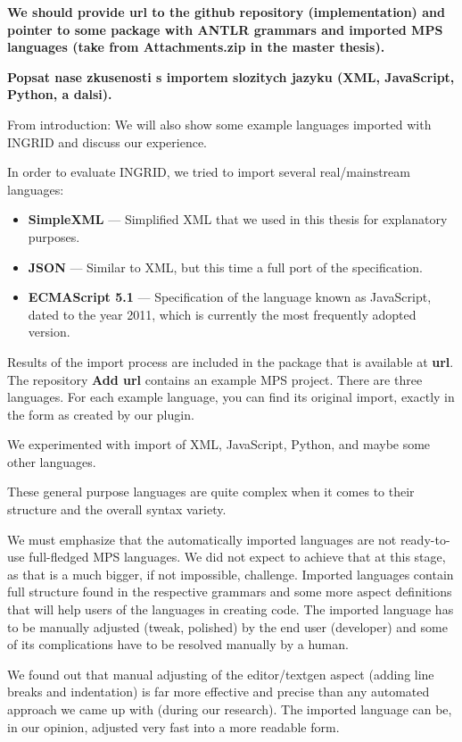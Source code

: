 \documentclass[10pt]{sigplanconf}
\newcommand{\todo}[1]{{\bfseries #1}}
\begin{document}
\todo{
	We should provide url to the github repository (implementation) and pointer to some package with ANTLR grammars and imported MPS languages (take from Attachments.zip in the master thesis).
}

\todo{Popsat nase zkusenosti s importem slozitych jazyku (XML, JavaScript, Python, a dalsi).}

From introduction: We will also show some example languages imported with INGRID and discuss our experience.

In order to evaluate INGRID, we tried to import several real/mainstream languages:
\begin{itemize}
	\item \textbf{SimpleXML} --- Simplified XML that we used in this thesis for explanatory purposes.
	\item \textbf{JSON} --- Similar to XML, but this time a full port of the specification.
	\item \textbf{ECMAScript 5.1} --- Specification of the language known as JavaScript, dated to the year 2011, which is currently the most frequently adopted version.
\end{itemize}
Results of the import process are included in the package that is available at \todo{url}.
The repository \todo{Add url} contains an example MPS project. There are three languages.
For each example language, you can find its original import, exactly in the form as created by our plugin.

We experimented with import of XML, JavaScript, Python, and maybe some other languages.

These general purpose languages are quite complex when it comes to their structure and the overall syntax variety.

We must emphasize that the automatically imported languages are not ready-to-use full-fledged MPS languages.
We did not expect to achieve that at this stage, as that is a much bigger, if not impossible, challenge.
Imported languages contain full structure found in the respective grammars and some more aspect definitions that will help users of the languages in creating code.
The imported language has to be manually adjusted (tweak, polished) by the end user (developer) and some of its complications have to be resolved manually by a human.

We found out that manual adjusting of the editor/textgen aspect (adding line breaks and indentation) is far more effective and precise than any automated approach we came up with (during our research).
The imported language can be, in our opinion, adjusted very fast into a more readable form.
\end{document}
